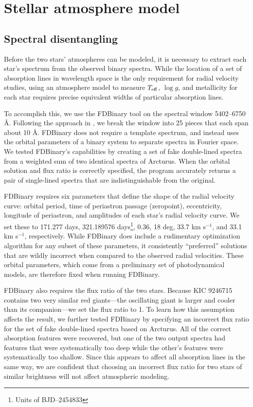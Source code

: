 \section{Stellar atmosphere model}\label{atm}

\subsection{Spectral disentangling}\label{disentangle}
Before the two stars' atmospheres can be modeled, it is necessary to extract each star's spectrum from the observed binary spectra. While the location of a set of absorption lines in wavelength space is the only requirement for radial velocity studies, using an atmosphere model to measure $T_{\rm{eff}}$, $\log g$, and metallicity for each star requires precise equivalent widths of particular absorption lines.

To accomplish this, we use the FDBinary tool \citep{ili04} on the spectral window 5402--6750 \AA. Following the approach in \citet{bec14}, we break the window into 25 pieces that each span about 10 \AA. FDBinary does not require a template spectrum, and instead uses the orbital parameters of a binary system to separate spectra in Fourier space. We tested FDBinary's capabilities by creating a set of fake double-lined spectra from a weighted sum of two identical spectra of Arcturus. When the orbital solution and flux ratio is correctly specified, the program accurately returns a pair of single-lined spectra that are indistinguishable from the original.

FDBinary requires six parameters that define the shape of the radial velocity curve: orbital period, time of periastron passage (zeropoint), eccentricity, longitude of periastron, and amplitudes of each star's radial velocity curve. We set these to 171.277 days, 321.189576 days\footnote{Units of BJD--2454833}, 0.36, 18 deg, 33.7 km s$^{-1}$, and 33.1 km s$^{-1}$, respectively. While FDBinary does include a rudimentary optimization algorithm for any subset of these parameters, it consistently ``preferred'' solutions that are wildly incorrect when compared to the observed radial velocities. These orbital parameters, which come from a preliminary set of photodynamical models, are therefore fixed when running FDBinary.

FDBinary also requires the flux ratio of the two stars. Because KIC 9246715 contains two very similar red giants---the oscillating giant is larger and cooler than its companion---we set the flux ratio to 1. To learn how this assumption affects the result, we further tested FDBinary by specifying an incorrect flux ratio for the set of fake double-lined spectra based on Arcturus. All of the correct absorption features were recovered, but one of the two output spectra had features that were systematically too deep while the other's features were systematically too shallow. Since this appears to affect all absorption lines in the same way, we are confident that choosing an incorrect flux ratio for two stars of similar brightness will not affect atmospheric modeling.

